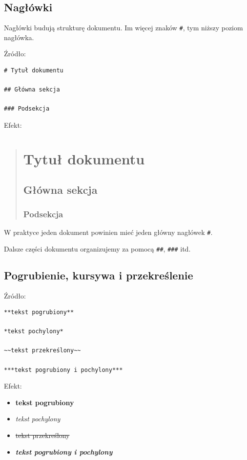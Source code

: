 \documentclass[12pt,a4paper]{article}
\begin{document}
\subsection{Nagłówki}

Nagłówki budują strukturę dokumentu. Im więcej znaków \texttt{\#}, tym niższy poziom nagłówka.

Źródło:

\begin{lstlisting}
# Tytuł dokumentu

## Główna sekcja

### Podsekcja
\end{lstlisting}

Efekt:

\begin{quote}
    \section*{Tytuł dokumentu}
    \subsection*{Główna sekcja}
    \subsubsection*{Podsekcja}
\end{quote}

W praktyce jeden dokument powinien mieć jeden główny nagłówek \texttt{\#}.

Dalsze części dokumentu organizujemy za pomocą
\texttt{\#\#}, \texttt{\#\#\#} itd.

\subsection{Pogrubienie, kursywa i przekreślenie}

Źródło:

\begin{lstlisting}
**tekst pogrubiony**

*tekst pochylony*

~~tekst przekreślony~~

***tekst pogrubiony i pochylony***
\end{lstlisting}

Efekt:

\begin{itemize}
    \item \textbf{tekst pogrubiony}
    \item \textit{tekst pochylony}
    \item \sout{tekst przekreślony}
    \item \textbf{\textit{tekst pogrubiony i pochylony}}
\end{itemize}
\end{document}

